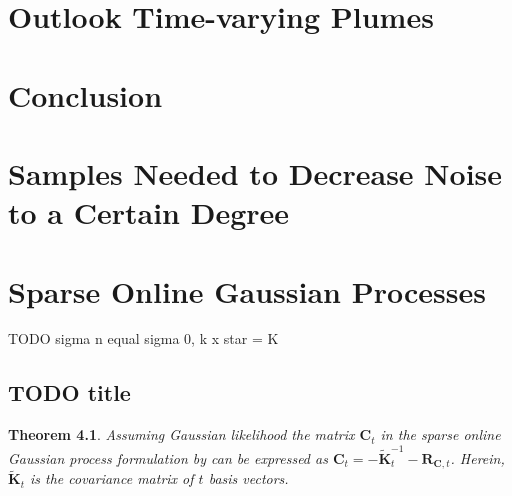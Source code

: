 \documentclass[11pt,a4paper,twoside,BCOR=15mm]{scrbook}
\newtheorem{theorem}{Theorem}
\newcommand{\mat}[1]{\bm{#1}}
\begin{document}
\tableofcontents


\printglossary[title={Symbols and Notation}]

\printglossary[type=\acronymtype]

\mainmatter{}







\chapter{Outlook Time-varying Plumes}

\chapter{Conclusion}

\appendix
\chapter{Samples Needed to Decrease Noise to a Certain Degree} 
\label{sec:decnoise}

\chapter{Sparse Online Gaussian Processes}\label{sec:sparse-gp-apdx}
TODO sigma n equal sigma 0, k x star = K

\section{TODO title}

\begin{theorem}
Assuming Gaussian likelihood the matrix $\mat C_t$ in the sparse online Gaussian 
process formulation by \textcite{Csato:2002fp} can be expressed as $\mat C_t 
= -\tilde{\mat K}_t^{-1} - \mat R_{\mat C,t}$. Herein, $\tilde{\mat K}_t$ is the 
covariance matrix of $t$ basis vectors.
\end{theorem}
\end{document}
